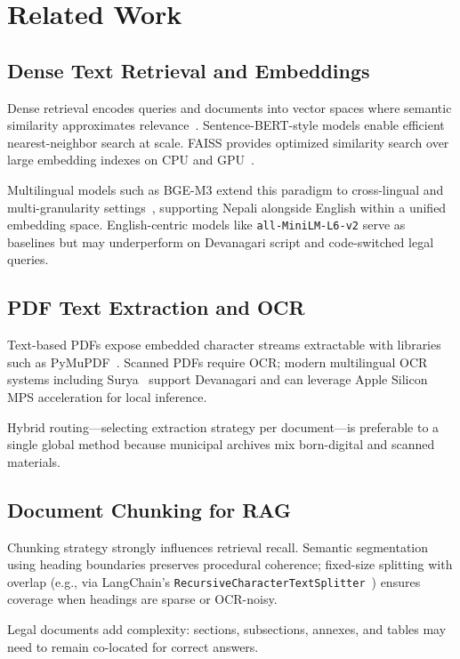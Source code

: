 \chapter{Related Work}
\label{ch:related}

\section{Dense Text Retrieval and Embeddings}
Dense retrieval encodes queries and documents into vector spaces where semantic similarity approximates relevance~\cite{reimers2019sentence}. Sentence-BERT-style models enable efficient nearest-neighbor search at scale. FAISS provides optimized similarity search over large embedding indexes on CPU and GPU~\cite{johnson2019faiss}.

Multilingual models such as BGE-M3 extend this paradigm to cross-lingual and multi-granularity settings~\cite{chen2024bge}, supporting Nepali alongside English within a unified embedding space. English-centric models like \texttt{all-MiniLM-L6-v2} serve as baselines but may underperform on Devanagari script and code-switched legal queries.

\section{PDF Text Extraction and OCR}
Text-based PDFs expose embedded character streams extractable with libraries such as PyMuPDF~\cite{pymupdf}. Scanned PDFs require OCR; modern multilingual OCR systems including Surya~\cite{suryaocr} support Devanagari and can leverage Apple Silicon MPS acceleration for local inference.

Hybrid routing---selecting extraction strategy per document---is preferable to a single global method because municipal archives mix born-digital and scanned materials.

\section{Document Chunking for RAG}
Chunking strategy strongly influences retrieval recall. Semantic segmentation using heading boundaries preserves procedural coherence; fixed-size splitting with overlap (e.g., via LangChain's \texttt{RecursiveCharacterTextSplitter}~\cite{langchain_splitters}) ensures coverage when headings are sparse or OCR-noisy.

Legal documents add complexity: sections, subsections, annexes, and tables may need to remain co-located for correct answers.

